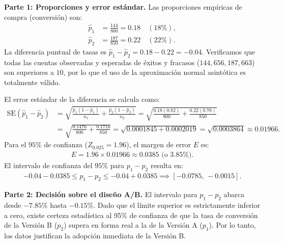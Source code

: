 \begin{solproblema}
	\textbf{Parte 1: Proporciones y error estándar.}
	Las proporciones empíricas de compra (conversión) son:
	\begin{align}
		\hat{p}_1 &= \frac{144}{800} = 0.18 \quad (18\%), \\
		\hat{p}_2 &= \frac{187}{850} = 0.22 \quad (22\%).
	\end{align}
	La diferencia puntual de tasas es $\hat{p}_1 - \hat{p}_2 = 0.18 - 0.22 = -0.04$. Verificamos que todas las cuentas observadas y esperadas de éxitos y fracasos ($144, 656, 187, 663$) son superiores a $10$, por lo que el uso de la aproximación normal asintótica es totalmente válido.
	
	El error estándar de la diferencia se calcula como:
	\begin{align}
		\text{SE}(\hat{p}_1 - \hat{p}_2) &= \sqrt{\frac{\hat{p}_1(1-\hat{p}_1)}{n_1} + \frac{\hat{p}_2(1-\hat{p}_2)}{n_2}} = \sqrt{\frac{0.18(0.82)}{800} + \frac{0.22(0.78)}{850}} \\
		&= \sqrt{\frac{0.1476}{800} + \frac{0.1716}{850}} = \sqrt{0.0001845 + 0.0002019} = \sqrt{0.0003864} \approx 0.01966.
	\end{align}
	Para el $95\%$ de confianza ($Z_{0.025} = 1.96$), el margen de error $E$ es:
	\begin{align}
		E = 1.96 \times 0.01966 \approx 0.0385 \text{ (o 3.85\%).}
	\end{align}
	El intervalo de confianza del $95\%$ para $p_1 - p_2$ resulta en:
	\begin{align}
		-0.04 - 0.0385 \le p_1 - p_2 \le -0.04 + 0.0385 \implies [-0.0785, \, -0.0015].
	\end{align}
	
	\textbf{Parte 2: Decisión sobre el diseño A/B.}
	El intervalo para $p_1 - p_2$ abarca desde $-7.85\%$ hasta $-0.15\%$. Dado que el límite superior es estrictamente inferior a cero, existe certeza estadística al 95\% de confianza de que la tasa de conversión de la Versión B ($p_2$) supera en forma real a la de la Versión A ($p_1$). Por lo tanto, los datos justifican la adopción inmediata de la Versión B.
\end{solproblema}

